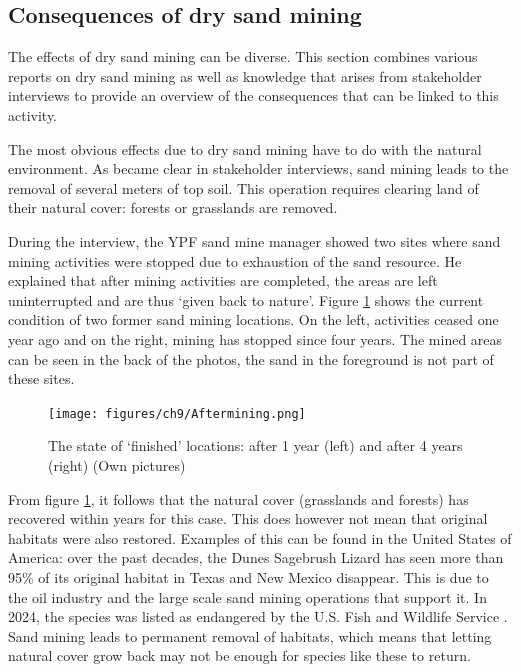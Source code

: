 \subsection{Consequences of dry sand mining}
\label{sect:dryminingeffects}
The effects of dry sand mining can be diverse. This section combines various reports on dry sand mining as well as knowledge that arises from stakeholder interviews to provide an overview of the consequences that can be linked to this activity.

The most obvious effects due to dry sand mining have to do with the natural environment. As became clear in stakeholder interviews, sand mining leads to the removal of several meters of top soil. This operation requires clearing land of their natural cover: forests or grasslands are removed.

During the interview, the YPF sand mine manager showed two sites where sand mining activities were stopped due to exhaustion of the sand resource. He explained that after mining activities are completed, the areas are left uninterrupted and are thus `given back to nature'. Figure \ref{fig:aftermining} shows the current condition of two former sand mining locations. On the left, activities ceased one year ago and on the right, mining has stopped since four years. The mined areas can be seen in the back of the photos, the sand in the foreground is not part of these sites.

\begin{figure}[H]
    \centering
    \texttt{[image: figures/ch9/Aftermining.png]}
    \caption{The state of `finished' locations: after 1 year (left) and after 4 years (right) (Own pictures)}
    \label{fig:aftermining}
\end{figure}

From figure \ref{fig:aftermining}, it follows that the natural cover (grasslands and forests) has recovered within years for this case. This does however not mean that original habitats were also restored. Examples of this can be found in the United States of America: over the past decades, the Dunes Sagebrush Lizard has seen more than 95\% of its original habitat in Texas and New Mexico disappear. This is due to the oil industry and the large scale sand mining operations that support it. In 2024, the species was listed as endangered by the U.S. Fish and Wildlife Service \autocite{centerforbiologicaldiversityLegalInterventionLaunched2025}. Sand mining leads to permanent removal of habitats, which means that letting natural cover grow back may not be enough for species like these to return.


